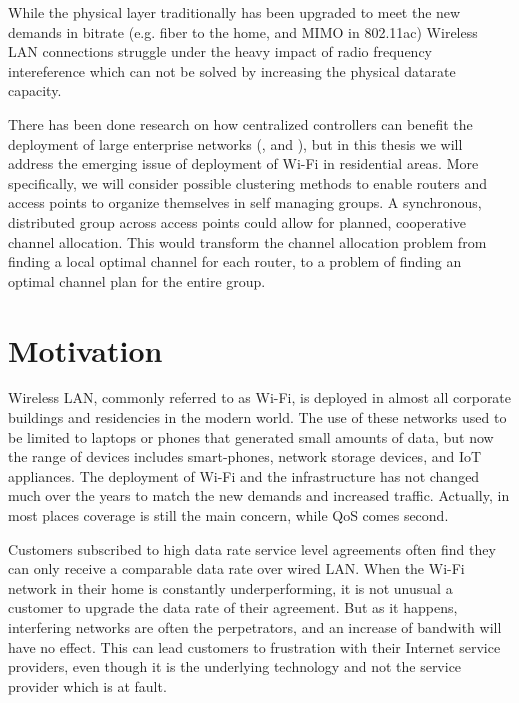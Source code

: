 While the physical layer traditionally has been upgraded to meet the new demands in bitrate (e.g. fiber to the home, 
and MIMO in 802.11ac) Wireless LAN connections struggle under the heavy impact of radio frequency intereference which can not be solved by increasing
the physical datarate capacity.

There has been done research on how centralized controllers can benefit the deployment of large enterprise networks (\cite{Murty}, \cite{Murty2} and \cite{Suresh}),
but in this thesis we will address the emerging issue of deployment of Wi-Fi in residential areas. More specifically, we will consider possible clustering methods
to enable routers and access points to organize themselves in self managing groups. A synchronous, distributed group across access points
could allow for planned, cooperative channel allocation. This would transform the channel allocation problem from finding a local optimal channel for each router,
to a problem of finding an optimal channel plan for the entire group.

\section{Motivation}
Wireless LAN, commonly referred to as Wi-Fi, is deployed in almost all corporate buildings and residencies in the modern world.
The use of these networks used to be limited to laptops or phones that generated small amounts of data, but now the range of devices includes
smart-phones, network storage devices, and IoT appliances. The deployment of Wi-Fi and the infrastructure has not 
changed much over the years to match the new demands and increased traffic. Actually, in most places coverage is still the main concern, while
QoS comes second. 

Customers subscribed to high data rate service level agreements often find they can only receive a comparable data rate over wired LAN.
When the Wi-Fi network in their home is constantly underperforming, it is not unusual a customer to upgrade the data rate of their agreement.
But as it happens, interfering networks are often the perpetrators, and an increase of bandwith will have no effect.
This can lead customers to frustration with their Internet service providers, even though it is the underlying technology and not the service provider which is at fault.

